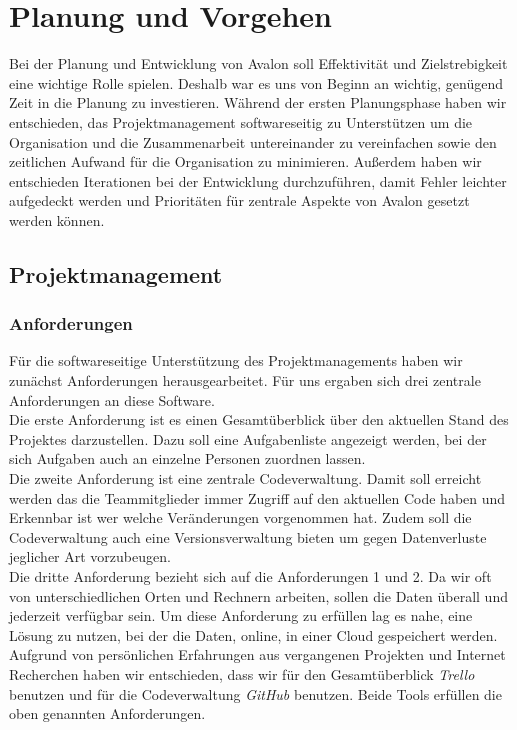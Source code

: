
\chapter{Planung und Vorgehen}

Bei der Planung und Entwicklung von Avalon soll Effektivität und Zielstrebigkeit eine wichtige Rolle spielen. Deshalb war es uns von Beginn an wichtig, genügend Zeit in die Planung zu investieren. Während der ersten Planungsphase haben wir entschieden, das Projektmanagement softwareseitig zu Unterstützen um die Organisation und die  Zusammenarbeit untereinander zu vereinfachen sowie den zeitlichen Aufwand für die Organisation zu minimieren. Außerdem haben wir entschieden Iterationen bei der Entwicklung durchzuführen, damit Fehler leichter aufgedeckt werden und Prioritäten  für zentrale Aspekte von Avalon gesetzt werden können.

\section{Projektmanagement}

\subsection{Anforderungen}

Für die softwareseitige Unterstützung des Projektmanagements haben wir zunächst Anforderungen herausgearbeitet. Für uns ergaben sich drei zentrale Anforderungen an diese Software. \\
Die erste Anforderung ist es einen Gesamtüberblick über den aktuellen Stand des Projektes darzustellen. Dazu soll eine Aufgabenliste angezeigt werden, bei der sich Aufgaben auch an einzelne Personen zuordnen lassen.\\
Die zweite Anforderung ist eine zentrale Codeverwaltung. Damit soll erreicht werden das die Teammitglieder immer Zugriff auf den aktuellen Code haben und Erkennbar ist wer welche Veränderungen vorgenommen hat. Zudem soll die Codeverwaltung auch eine Versionsverwaltung bieten um gegen Datenverluste jeglicher Art vorzubeugen.\\
Die dritte Anforderung bezieht sich auf die Anforderungen 1 und 2. Da wir oft von unterschiedlichen Orten und Rechnern arbeiten, sollen die Daten überall und jederzeit verfügbar sein. Um diese Anforderung zu erfüllen lag es nahe, eine Lösung zu nutzen, bei der die Daten, online, in einer Cloud gespeichert werden.
Aufgrund von persönlichen Erfahrungen aus vergangenen Projekten und Internet Recherchen haben wir entschieden, dass wir für den Gesamtüberblick \textit{Trello} benutzen und für die Codeverwaltung \textit{GitHub} benutzen. Beide Tools erfüllen die oben genannten Anforderungen.


